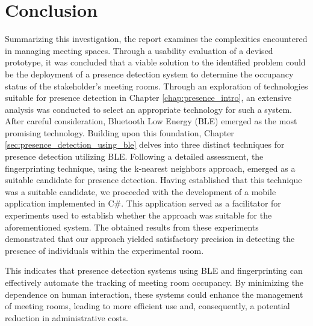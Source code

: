 \chapter{Conclusion}
Summarizing this investigation, the report examines the complexities encountered in managing meeting spaces. 
Through a usability evaluation of a devised prototype, it was concluded that a viable solution to the identified problem could be the deployment of a presence detection system to determine the occupancy status of the stakeholder's meeting rooms.
Through an exploration of technologies suitable for presence detection in Chapter \ref{chap:presence_intro}, an extensive analysis was conducted to select an appropriate technology for such a system.
After careful consideration, Bluetooth Low Energy (BLE) emerged as the most promising technology. 
Building upon this foundation, Chapter \ref{sec:presence_detection_using_ble} delves into three distinct techniques for presence detection utilizing BLE.
Following a detailed assessment, the fingerprinting technique, using the k-nearest neighbors approach, emerged as a suitable candidate for presence detection.
Having established that this technique was a suitable candidate, we proceeded with the development of a mobile application implemented in C#. 
This application served as a facilitator for experiments used to establish whether the approach was suitable for the aforementioned system. 
The obtained results from these experiments demonstrated that our approach yielded satisfactory precision in detecting the presence of individuals within the experimental room.

This indicates that presence detection systems using BLE and fingerprinting can effectively automate the tracking of meeting room occupancy.
By minimizing the dependence on human interaction, these systems could enhance the management of meeting rooms, leading to more efficient use and, consequently, a potential reduction in administrative costs.